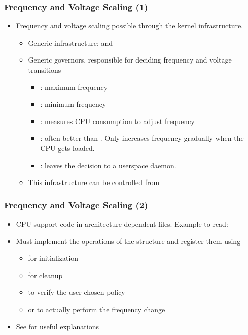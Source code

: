 \begin{frame}
  \frametitle{Frequency and Voltage Scaling (1)}
  \begin{itemize}
  \item Frequency and voltage scaling possible through the
     kernel infrastructure.
    \begin{itemize}
    \item Generic infrastructure:  and
    \item Generic governors, responsible for deciding frequency and
      voltage transitions
      \begin{itemize}
      \item {}: maximum frequency
      \item {}: minimum frequency
      \item {}: measures CPU consumption to adjust frequency
      \item {}: often better than
        . Only increases frequency gradually when the
        CPU gets loaded.
      \item {}: leaves the decision to a userspace
        daemon.
      \end{itemize}
    \item This infrastructure can be controlled from
    \end{itemize}
  \end{itemize}
\end{frame}

\begin{frame}
  \frametitle{Frequency and Voltage Scaling (2)}
  \begin{itemize}
  \item CPU support code in architecture dependent files.  Example to
    read: 
  \item Must implement the operations of the 
    structure and register them using 
    \begin{itemize}
    \item {} for initialization
    \item {} for cleanup
    \item {} to verify the user-chosen policy
    \item {} or  to actually perform
      the frequency change
    \end{itemize}
  \item See  for useful explanations
  \end{itemize}
\end{frame}

